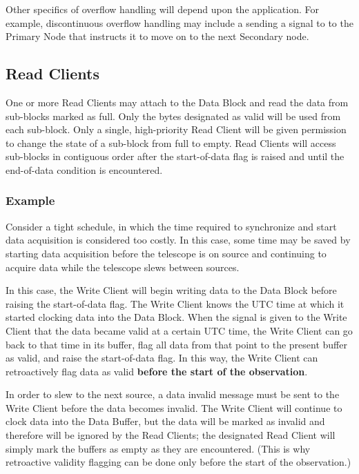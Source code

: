 Other specifics of overflow handling will depend upon the application.
For example, discontinuous overflow handling may include a sending a
signal to to the Primary Node that instructs it to move on to the next
Secondary node.

\subsection{Read Clients}

One or more Read Clients may attach to the Data Block and read the
data from sub-blocks marked as full.  Only the bytes designated as
valid will be used from each sub-block.  Only a single, high-priority
Read Client will be given permission to change the state of a
sub-block from full to empty.  Read Clients will access sub-blocks in
contiguous order after the start-of-data flag is raised and until the
end-of-data condition is encountered.

\subsubsection{Example}

Consider a tight schedule, in which the time required to synchronize
and start data acquisition is considered too costly.  In this case,
some time may be saved by starting data acquisition before the
telescope is on source and continuing to acquire data while the
telescope slews between sources.

In this case, the Write Client will begin writing data to the Data
Block before raising the start-of-data flag.  The Write Client knows
the UTC time at which it started clocking data into the Data Block.
When the signal is given to the Write Client that the data became
valid at a certain UTC time, the Write Client can go back to that time
in its buffer, flag all data from that point to the present buffer as
valid, and raise the start-of-data flag.  In this way, the Write
Client can retroactively flag data as valid {\bf before the start of
the observation}.

In order to slew to the next source, a data invalid message must be
sent to the Write Client before the data becomes invalid.  The Write
Client will continue to clock data into the Data Buffer, but the data
will be marked as invalid and therefore will be ignored by the Read
Clients; the designated Read Client will simply mark the buffers as
empty as they are encountered. (This is why retroactive validity
flagging can be done only before the start of the observation.)

